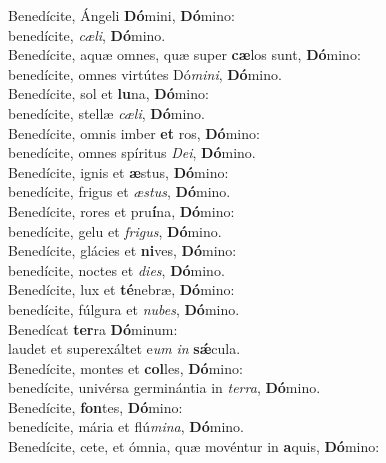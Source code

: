\evenverse Benedícite, Ángeli \textbf{Dó}mini, \textbf{Dó}mino:~\*\\
\evenverse benedícite, \textit{cæ}\textit{li}, \textbf{Dó}mino.\\
\oddverse Benedícite, aquæ omnes, quæ super \textbf{cæ}los sunt, \textbf{Dó}mino:~\*\\
\oddverse benedícite, omnes virtútes Dó\textit{mi}\textit{ni}, \textbf{Dó}mino.\\
\evenverse Benedícite, sol et \textbf{lu}na, \textbf{Dó}mino:~\*\\
\evenverse benedícite, stellæ \textit{cæ}\textit{li}, \textbf{Dó}mino.\\
\oddverse Benedícite, omnis imber \textbf{et} ros, \textbf{Dó}mino:~\*\\
\oddverse benedícite, omnes spíritus \textit{De}\textit{i}, \textbf{Dó}mino.\\
\evenverse Benedícite, ignis et \textbf{æ}stus, \textbf{Dó}mino:~\*\\
\evenverse benedícite, frigus et \textit{æ}\textit{stus}, \textbf{Dó}mino.\\
\oddverse Benedícite, rores et pru\textbf{í}na, \textbf{Dó}mino:~\*\\
\oddverse benedícite, gelu et \textit{fri}\textit{gus}, \textbf{Dó}mino.\\
\evenverse Benedícite, glácies et \textbf{ni}ves, \textbf{Dó}mino:~\*\\
\evenverse benedícite, noctes et \textit{di}\textit{es}, \textbf{Dó}mino.\\
\oddverse Benedícite, lux et \textbf{té}nebræ, \textbf{Dó}mino:~\*\\
\oddverse benedícite, fúlgura et \textit{nu}\textit{bes}, \textbf{Dó}mino.\\
\evenverse Benedícat \textbf{ter}ra \textbf{Dó}minum:~\*\\
\evenverse laudet et superexáltet e\textit{um} \textit{in} \textbf{sǽ}cula.\\
\oddverse Benedícite, montes et \textbf{col}les, \textbf{Dó}mino:~\*\\
\oddverse benedícite, univérsa germinántia in \textit{ter}\textit{ra}, \textbf{Dó}mino.\\
\evenverse Benedícite, \textbf{fon}tes, \textbf{Dó}mino:~\*\\
\evenverse benedícite, mária et flú\textit{mi}\textit{na}, \textbf{Dó}mino.\\
\oddverse Benedícite, cete, et ómnia, quæ movéntur in \textbf{a}quis, \textbf{Dó}mino:~\*\\
